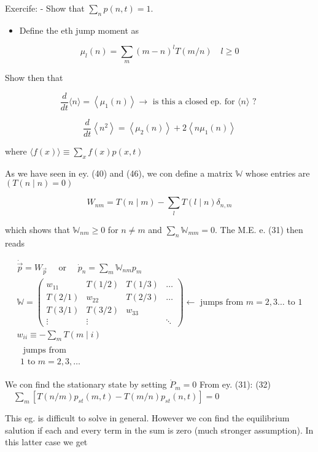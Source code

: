 Exercife: - Show that $\sum_{n} p(n, t)=1$.

\begin{itemize}
  \item Define the eth jump moment as
\end{itemize}

$$ \mu_{l}(n)=\sum_{m}(m-n)^{l} T(m / n) \quad l \geqslant 0 $$

Show then that

$$ \frac{d}{d t}\langle n\rangle=\left\langle\mu_{1}(n)\right\rangle \rightarrow \text { is this a closed ep. for }\langle n\rangle \text { ? } $$

$$ \frac{d}{d t}\left\langle n^{2}\right\rangle=\left\langle\mu_{2}(n)\right\rangle+2\left\langle n \mu_{1}(n)\right\rangle $$

where $\langle f(x)\rangle \equiv \sum_{x} f(x) p(x, t)$

As we have seen in ey. (40) and (46), we con define a matrix $\mathbb{W}$ whose entries are $(T(n \mid n)=0)$

$$ W_{n m}=T(n \mid m)-\sum_{l} T(l \mid n) \delta_{n, m} $$

which shows that $\mathbb{W}_{n m} \geq 0$ for $n \neq m$ and $\sum_{n} \mathbb{W}_{m m}=0$. The M.E. e. (31) then reads

$$ 
\begin{gathered}
\dot{\vec{p}}=W_{\vec{p}} \quad \text { or } \quad \dot{p}_{n}=\sum_{m} \mathbb{W}_{n m} p_{m} \\
\mathbb{W}=\left(\begin{array}{cccc}
 w_{11} & T(1 / 2) & T(1 / 3) & \ldots \\
 T(2 / 1) & w_{22} & T(2 / 3) & \ldots \\
 T(3 / 1) & T(3 / 2) & w_{33} & \\
 \vdots & \vdots & & \ddots
\end{array}\right) \leftarrow \text { jumps from } m=2,3 \ldots \text { to } 1 \\
 w_{ii} \equiv-\sum_{m} T(m \mid i) \\
 \substack{\text { jumps from } \\
 1 \text { to } m=2,3, \ldots}
\end{gathered}
$$ 

We con find the stationary state by setting $\dot{P}_{m}=0$ From ey. (31):
(32) $\quad \sum_{m}\left[T(n / m) p_{s t}(m, t)-T(m / n) p_{s t}(n, t)\right]=0$

This eg. is difficult to solve in general. However we con find the equilibrium salution if each and every term in the sum is zero (much stronger assumption). In this latter case we get

